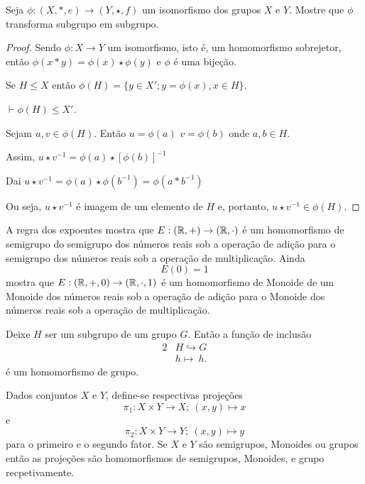\begin{exmp}
  Seja $\phi:(X, *, e) \to (Y, \star, f)$ um isomorfismo dos grupos $X$ e $Y$. Mostre que $\phi$ transforma subgrupo em subgrupo.
  \begin{proof}
    Sendo $\phi: X \to Y$ um isomorfismo, isto é, um homomorfismo sobrejetor, então $\phi(x*y) = \phi(x) \star \phi(y)$ e $\phi$ é uma bijeção.

    Se $H \leq X$ então $\phi(H) = \{y \in X'; y = \phi(x), x\in H\}$.

    \quad $\vdash \phi(H) \leq X'$.

    Sejam $u,v \in \phi(H)$. Então $u = \phi(a)$ $v = \phi(b)$ onde $a,b \in H$.

    Assim, $u \star v^{-1} = \phi(a) \star [\phi(b)]^{-1}$

    Dai $u \star v^{-1} = \phi(a) \star \phi(b^{-1}) = \phi(a * b^{-1})$

    Ou seja, $u \star v^{-1}$ é imagem de um elemento de $H$ e, portanto, $u \star v^{-1} \in \phi(H)$.
  \end{proof}
\end{exmp}

\begin{exmp}
  A regra dos expoentes mostra que $E: (\mathbb{R}, +) \to (\mathbb{R},\cdot)$ é um homomorfismo de semigrupo do semigrupo dos números reais sob a operação de adição para o semigrupo dos números reais sob a operação de multiplicação. Ainda $$E(0)=1$$ mostra que $E: (\mathbb{R},+,0) \to (\mathbb{R},\cdot,1)$ é um homomorfismo de Monoide de um Monoide dos números reais sob a operação de adição para o Monoide dos números reais sob a operação de multiplicação.
\end{exmp}
\begin{exmp}
  Deixe $H$ ser um subgrupo de um grupo $G$. Então a função de inclusão
  \begin{alignat}{2}
    &H \hookrightarrow G \nonumber\\
    &h \mapsto\ h.
    \nonumber
  \end{alignat}
  é um homomorfismo de grupo.
\end{exmp}
\begin{exmp}
  Dados conjuntos $X$ e $Y$, define-se respectivas projeções
  $$\pi_{1}: X\times Y \to X;\ (x,y)\mapsto x$$ e $$\pi_{2}: X\times Y \to Y;\ (x,y)\mapsto y$$
  para o primeiro e o segundo fator. Se $X$ e $Y$ são semigrupos, Monoides ou grupos então as projeções são homomorfismos de semigrupos, Monoides, e grupo recpetivamente.
\end{exmp}


